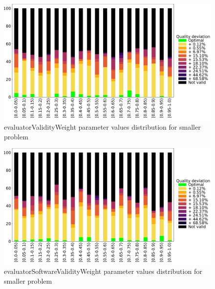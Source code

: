 \begin{figure}
	\centering
	\includegraphics[width=\textwidth]{images/DistrObj/evaluatorValidityWeight.pdf}
	\caption[evaluatorValidityWeight parameter values distribution for smaller problem]{evaluatorValidityWeight parameter values distribution for smaller problem}
	\label{fig:evaluatorValidityWeight_Obj}
\end{figure}
\begin{figure}
	\centering
	\includegraphics[width=\textwidth]{images/DistrObj/evaluatorSoftwareValidityWeight.pdf}
	\caption[evaluatorSoftwareValidityWeight parameter values distribution for smaller problem]{evaluatorSoftwareValidityWeight parameter values distribution for smaller problem}
	\label{fig:evaluatorSoftwareValidityWeight_Obj}
\end{figure}
